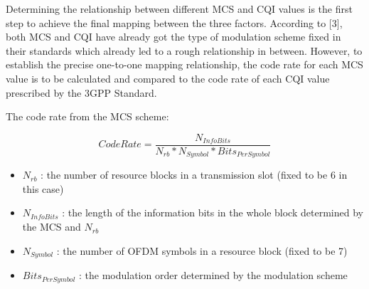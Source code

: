 \documentclass[journal,comsoc]{IEEEtran}
\begin{document}
Determining the relationship between different MCS and CQI values is the first step to achieve the final mapping between the three factors. According to [3], both MCS and CQI have already got the type of modulation scheme fixed in their standards which already led to a rough relationship in between. However, to establish the precise one-to-one mapping relationship, the code rate for each MCS value is to be calculated and compared to the code rate of each CQI value prescribed by the 3GPP Standard.

The code rate from the MCS scheme:

\[CodeRate = \frac{N_{InfoBits}}{N_{rb} * N_{Symbol} * Bits_{PerSymbol}}\]

\begin{itemize}
  \item \(N_{rb}\) : the number of resource blocks in a transmission slot (fixed to be 6 in this case)
  \item \(N_{InfoBits}\) : the length of the information bits in the whole block determined by the MCS and \(N_{rb}\)
  \item \(N_{Symbol}\) : the number of OFDM symbols in a resource block (fixed to be 7)
  \item \(Bits_{PerSymbol}\) : the modulation order determined by the modulation scheme
\end{itemize}
\end{document}
